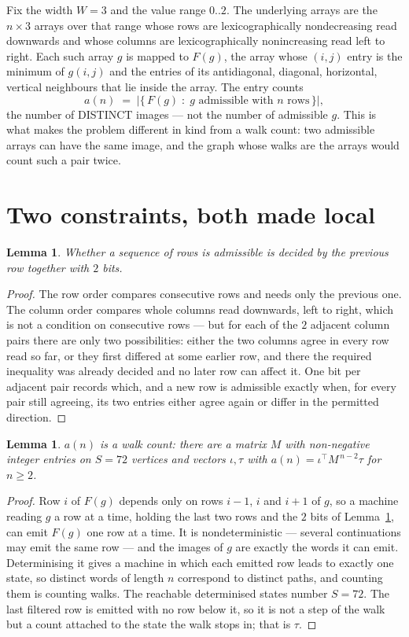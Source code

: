 \documentclass[11pt,a4paper]{article}
\theoremstyle{plain}
\newtheorem{lemma}[theorem]{Lemma}
\theoremstyle{definition}
\begin{document}
Fix the width $W=3$ and the value range $0..2$. The underlying arrays are the
$n\times3$ arrays over that range whose rows are lexicographically nondecreasing read downwards
and whose columns are lexicographically nonincreasing read left to right. Each such array $g$
is mapped to $F(g)$, the array whose $(i,j)$ entry is the minimum of $g(i,j)$ and the entries
of its antidiagonal, diagonal, horizontal, vertical neighbours that lie inside the array. The entry counts
\[
a(n)\;=\;\bigl|\{\,F(g)\;:\;g\text{ admissible with }n\text{ rows}\,\}\bigr|,
\]
the number of DISTINCT images --- not the number of admissible $g$. This is what makes the
problem different in kind from a walk count: two admissible arrays can have the same image, and
the graph whose walks are the arrays would count such a pair twice.

\section{Two constraints, both made local}

\begin{lemma}\label{lem:local}
Whether a sequence of rows is admissible is decided by the previous row together with
$2$ bits.
\end{lemma}

\begin{proof}
The row order compares consecutive rows and needs only the previous one. The column order
compares whole columns read downwards, left to right, which is not a condition on consecutive
rows --- but for each of the $2$ adjacent column pairs there are only two possibilities:
either the two columns agree in every row read so far, or they first differed at some earlier
row, and there the required inequality was already decided and no later row can affect it. One
bit per adjacent pair records which, and a new row is admissible exactly when, for every pair
still agreeing, its two entries either agree again or differ in the permitted direction.
\end{proof}

\begin{lemma}\label{lem:det}
$a(n)$ is a walk count: there are a matrix $M$ with non-negative integer entries on $S=72$
vertices and vectors $\iota,\tau$ with $a(n)=\iota^{\!\top}M^{\,n-2}\tau$ for $n\ge2$.
\end{lemma}

\begin{proof}
Row $i$ of $F(g)$ depends only on rows $i-1$, $i$ and $i+1$ of $g$, so a machine reading $g$ a
row at a time, holding the last two rows and the $2$ bits of Lemma~\ref{lem:local}, can
emit $F(g)$ one row at a time. It is nondeterministic --- several continuations may emit the
same row --- and the images of $g$ are exactly the words it can emit. Determinising it gives a
machine in which each emitted row leads to exactly one state, so distinct words of length $n$
correspond to distinct paths, and counting them is counting walks. The reachable determinised
states number $S=72$. The last filtered row is emitted with no row below it, so it is not a
step of the walk but a count attached to the state the walk stops in; that is $\tau$.
\end{proof}
\end{document}
